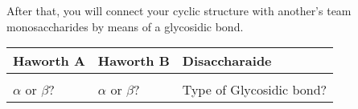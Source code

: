 \documentclass[main.tex]{subfiles}
\begin{document}
\begin{fullwidth}
After that, you will connect your cyclic structure with another's team monosaccharides by means of a glycosidic bond. 


\begin{center}\begin{tabular}{ |p{4cm}|p{4cm}|p{8cm}| }
\hline
Haworth A &  Haworth B    &Disaccharaide   \\
\hline
&&\vspace{1cm}\vspace{1cm}\vspace{1cm}
    \\
\hline
$\alpha$ or $\beta$?\vspace{0.4cm} &  $\alpha$ or $\beta$?\vspace{0.4cm} &  Type of Glycosidic bond?\vspace{0.4cm}  \\
\hline
\end{tabular}\end{center}






\end{fullwidth}
\end{document}
